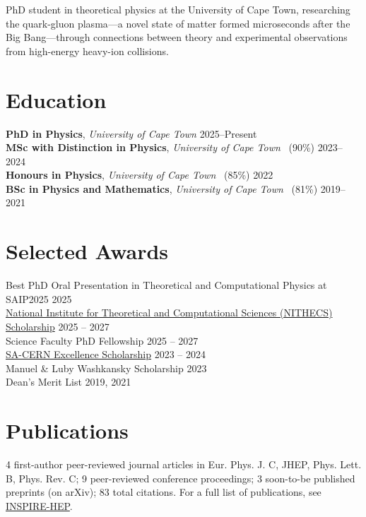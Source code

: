 \documentclass[10pt,letter,sans]{moderncv}
\begin{document}
\makecvtitle
\vspace{-0.8cm}

PhD student in theoretical physics at the University of Cape Town, researching the quark-gluon plasma---a novel state of matter formed microseconds after the Big Bang---through connections between theory and experimental observations from high-energy heavy-ion collisions.


\section{Education}
    \textbf{PhD in Physics}, \emph{University of Cape Town}%
    \hfill 2025--Present \\
    \textbf{MSc with Distinction in Physics}, \emph{University of Cape Town}%
        ~(90\%)%
    \hfill 2023--2024 \\
    \textbf{Honours in Physics}, \emph{University of Cape Town}%
        ~(85\%)%
    \hfill 2022 \\
    \textbf{BSc in Physics and Mathematics}, \emph{University of Cape Town}%
        ~(81\%)%
    \hfill 2019--2021 \\


\section{Selected Awards}
Best PhD Oral Presentation in Theoretical and Computational Physics at SAIP2025  \hfill 2025 \\
\href{https://nithecs.ac.za/}{National Institute for Theoretical and Computational Sciences (NITHECS) Scholarship}  \hfill 2025 -- 2027 \\
Science Faculty PhD Fellowship  \hfill 2025 -- 2027 \\
\href{https://tlabs.ac.za/sa-cern/}{SA-CERN Excellence Scholarship}  \hfill 2023 -- 2024 \\
Manuel \& Luby Washkansky Scholarship  \hfill 2023 \\
Dean's Merit List  \hfill 2019, 2021 \\


\section{Publications}
4 first-author peer-reviewed journal articles in Eur. Phys. J. C, JHEP, Phys. Lett. B, Phys. Rev. C;
9 peer-reviewed conference proceedings;
3 soon-to-be published preprints (on arXiv);
83 total citations.  For a full list of publications, see \href{https://inspirehep.net/authors/2661508}{INSPIRE-HEP}.
\end{document}

